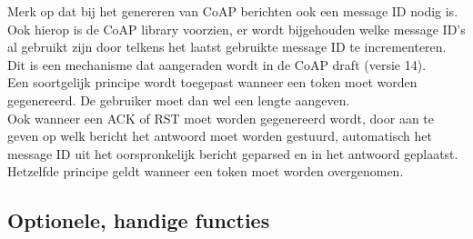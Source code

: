 Merk op dat bij het genereren van CoAP berichten ook een message ID nodig is. Ook hierop is de CoAP library voorzien, er wordt bijgehouden welke message ID's al gebruikt zijn door telkens het laatst gebruikte message ID te incrementeren. Dit is een mechanisme dat aangeraden wordt in de CoAP draft (versie 14).\\
Een soortgelijk principe wordt toegepast wanneer een token moet worden gegenereerd. De gebruiker moet dan wel een lengte aangeven.\\
Ook wanneer een ACK of RST moet worden gegenereerd wordt, door aan te geven op welk bericht het antwoord moet worden gestuurd, automatisch het message ID uit het oorspronkelijk bericht geparsed en in het antwoord geplaatst. Hetzelfde principe geldt wanneer een token moet worden overgenomen.

\subsection{Optionele, handige functies} \label{optionelefuncties}

